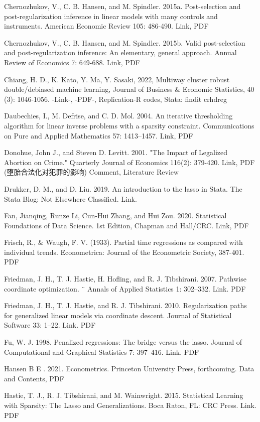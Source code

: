 {Chernozhukov, V., C. B. Hansen, and M. Spindler. 2015a. 
Post-selection and post-regularization inference in linear models with many controls and instruments. American Economic Review 105: 486-490. 
Link, PDF

Chernozhukov, V., C. B. Hansen, and M. Spindler. 
2015b. Valid post-selection and post-regularization inference: An elementary, general approach. Annual Review of Economics 7: 649-688. Link, PDF


Chiang, H. D., K. Kato, Y. Ma, Y. Sasaki, 2022, Multiway cluster robust double/debiased machine learning, Journal of Business \& Economic Statistics, 40 (3): 1046-1056. -Link-, -PDF-, Replication-R codes, Stata: findit crhdreg

Daubechies, I., M. Defrise, and C. D. Mol. 2004. An iterative thresholding algorithm for linear inverse
problems with a sparsity constraint. Communications on Pure and Applied Mathematics 57: 1413–1457.
Link, PDF

Donohue, John J., and Steven D. Levitt. 2001. "The Impact of Legalized Abortion on Crime." Quarterly Journal of Economics 116(2): 379-420. Link, PDF (堕胎合法化对犯罪的影响)
Comment, Literature Review

Drukker, D. M., and D. Liu. 2019. An introduction to the lasso in Stata. The Stata Blog: Not Elsewhere Classified.
Link.

Fan, Jianqing, Runze Li, Cun-Hui Zhang, and Hui Zou. 2020. Statistical Foundations of Data Science. 1st Edition, Chapman and Hall/CRC. Link, PDF

Frisch, R., \& Waugh, F. V. (1933). Partial time regressions as compared with individual trends. Econometrica: Journal of the Econometric Society, 387-401. PDF 

Friedman, J. H., T. J. Hastie, H. Hofling, and R. J. Tibshirani. 2007. Pathwise coordinate optimization. ¨ Annals of
Applied Statistics 1: 302–332. Link. PDF

Friedman, J. H., T. J. Hastie, and R. J. Tibshirani. 2010. Regularization paths for generalized linear models via
coordinate descent. Journal of Statistical Software 33: 1–22. Link. PDF

Fu, W. J. 1998. Penalized regressions: The bridge versus the lasso. Journal of Computational and Graphical Statistics
7: 397–416. Link. PDF

Hansen B E . 2021. Econometrics. Princeton University Press, forthcoming. Data and Contents, PDF

Hastie, T. J., R. J. Tibshirani, and M. Wainwright. 2015. Statistical Learning with Sparsity: The Lasso and
Generalizations. Boca Raton, FL: CRC Press. Link. PDF

}
